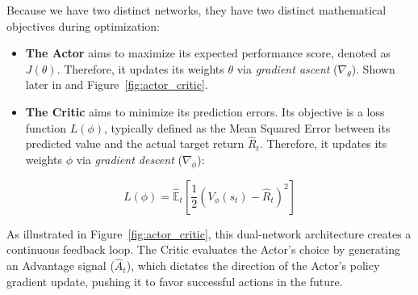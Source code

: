 Because we have two distinct networks, they have two distinct mathematical objectives during optimization:
\begin{itemize}
    \item \textbf{The Actor} aims to maximize its expected performance score, denoted as $J(\theta)$. Therefore, it updates its weights $\theta$ via \emph{gradient ascent} ($\nabla_\theta$). Shown later in  and Figure~\ref{fig:actor_critic}.
    \item \textbf{The Critic} aims to minimize its prediction errors. Its objective is a loss function $L(\phi)$, typically defined as the Mean Squared Error between its predicted value and the actual target return $\hat{R}_t$. Therefore, it updates its weights $\phi$ via \emph{gradient descent} ($\nabla_\phi$):
\end{itemize}
\begin{equation}
    L(\phi) = \hat{\mathbb{E}}_t \left[ \frac{1}{2} \left( V_\phi(s_t) - \hat{R}_t \right)^2 \right]
\end{equation}

As illustrated in Figure~\ref{fig:actor_critic}, this dual-network architecture creates a continuous feedback loop. The Critic evaluates the Actor's choice by generating an Advantage signal ($\hat{A}_t$), which dictates the direction of the Actor's policy gradient update, pushing it to favor successful actions in the future.

